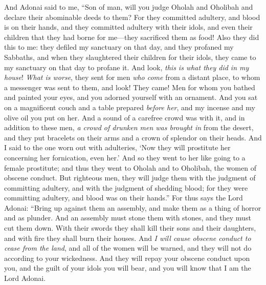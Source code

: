 \begin{biblechapter}
\verse And Adonai said to me, “Son of man, will you judge Oholah and Oholibah and declare their abominable deeds to them?
\verse For they committed adultery, and blood is on their hands, and they committed adultery with their idols, and even their children that they had borne for me—they sacrificed them as food!
\verse Also they did this to me: they defiled my sanctuary on that day, and they profaned my Sabbaths,
\verse and when they slaughtered their children for their idols, they came to my sanctuary on that day to profane it. And look, \textit{this is what they did in my house}!
\verse \textit{What is worse}, they sent for men \textit{who come} from a distant place, to whom a messenger was sent to them, and look! They came! Men for whom you bathed and painted your eyes, and you adorned yourself with an ornament.
\verse And you sat on a magnificent couch and a table prepared \textit{before her}, and my incense and my olive oil you put on her.
\verse And a sound of a carefree crowd was with it, and in addition to these men, \textit{a crowd of drunken men was brought in} from the desert, and they put bracelets on their arms and a crown of splendor on their heads.
\verse And I said to the one worn out with adulteries, ‘Now they will prostitute her concerning her fornication, even her.’
\verse And so they went to her like going to a female prostitute; and thus they went to Oholah and to Oholibah, the women of obscene conduct.
\verse But righteous men, they will judge them with the judgment of committing adultery, and with the judgment of shedding blood; for they were committing adultery, and blood was on their hands.”
\verse For thus says the Lord Adonai: “Bring up against them an assembly, and make them as a thing of horror and as plunder.
\verse And an assembly must stone them with stones, and they must cut them down. With their swords they shall kill their sons and their daughters, and with fire they shall burn their houses.
\verse And \textit{I will cause obscene conduct to cease from the land}, and all of the women will be warned, and they will not do according to your wickedness.
\verse And they will repay your obscene conduct upon you, and the guilt of your idols you will bear, and you will know that I am the Lord Adonai.
\end{biblechapter}

